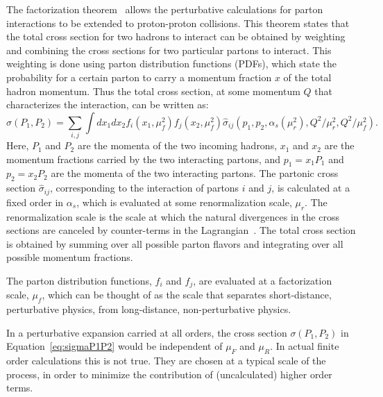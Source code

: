 The factorization theorem~\cite{Collins:1989gx} allows the perturbative calculations for parton interactions to be extended to proton-proton collisions. This theorem states that the total cross section for two hadrons to interact can be obtained by weighting and combining the cross sections for two particular partons to interact. This weighting is done using parton distribution functions (PDFs), which state the probability for a certain parton to carry a momentum fraction $x$ of the total hadron momentum. Thus the total cross section, at some momentum $Q$ that characterizes the interaction, can be written as:
%
\begin{equation}
\sigma(P_1,P_2) = \sum_{i,j} \int dx_1 dx_2 f_i(x_1,\mu^2_f) f_j(x_2,\mu^2_f) \hat{\sigma}_{ij}(p_1,p_2,\alpha_s(\mu^2_r),Q^2/\mu^2_r,Q^2/\mu^2_f).
 \label{eq:sigmaP1P2}
\end{equation}
%
Here, $P_1$ and $P_2$ are the momenta of the two incoming hadrons, $x_1$ and $x_2$ are the momentum fractions carried by the two interacting partons, and $p_1 = x_1P_1$ and $p_2 = x_2P_2$ are the momenta of the two interacting partons. 
The partonic cross section $\hat{\sigma}_{ij}$, corresponding to the interaction of partons $i$ and $j$, is calculated at a fixed order in $\alpha_s$, which is evaluated at some renormalization scale, $\mu_r$.  The renormalization scale is the scale at which the natural divergences in the cross sections are canceled by counter-terms in the Lagrangian~\cite{tHooft1973455,PhysRevD.8.3497}.  
The total cross section is obtained by summing over all possible parton flavors and integrating over all possible momentum fractions. 

The parton distribution functions, $f_i$ and $f_j$, are evaluated at a factorization scale, $\mu_f$, which can be thought of as the scale that separates short-distance, perturbative physics, from long-distance, non-perturbative physics.  %

In a perturbative expansion carried at all orders, the cross section $\sigma(P_1,P_2)$ in Equation~\ref{eq:sigmaP1P2} would be independent of $\mu_F$ and $\mu_R$. In actual finite order calculations this is not true. They are chosen at a typical scale of the process, in order to minimize the contribution of (uncalculated) higher order terms.

